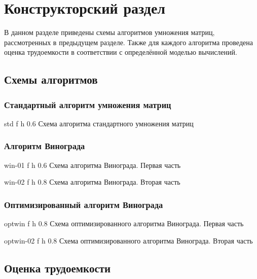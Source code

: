\chapter{Конструкторский раздел}

В данном разделе приведены схемы алгоритмов умножения матриц, рассмотренных в предыдущем разделе. Также для каждого алгоритма проведена оценка трудоемкости в соответствии с определённой моделью вычислений.

\section{Схемы алгоритмов}

\subsection{Стандартный алгоритм умножения матриц}

{std}
{f}
{h}
{0.6 \textwidth}
{Схема алгоритма стандартного умножения матриц}

\clearpage

\subsection{Алгоритм Винограда}

{win-01}
{f}
{h}
{0.6 \textwidth}
{Схема алгоритма Винограда. Первая часть}

\clearpage

{win-02}
{f}
{h}
{0.8 \textwidth}
{Схема алгоритма Винограда. Вторая часть}

\clearpage

\subsection{Оптимизированный алгоритм Винограда}

{optwin}
{f}
{h}
{0.8 \textwidth}
{Схема оптимизированного алгоритма Винограда. Первая часть}

\clearpage

{optwin-02}
{f}
{h}
{0.8 \textwidth}
{Схема оптимизированного алгоритма Винограда. Вторая часть}

\clearpage

\section{Оценка трудоемкости}

